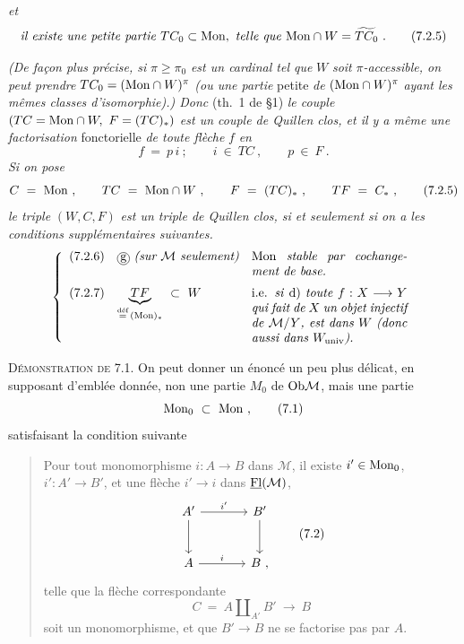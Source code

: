 
\textit{et}
\[
\text{\textit{il existe une petite partie} } TC_0 \subset \Mon, \text{ \textit{telle que} } \Mon \cap W = \widetilde{TC_0}\ . \tag*{(7.2.5)} %
\]

\textit{(De façon plus précise, si} $\pi \geq \pi_0$ \textit{est un cardinal tel que} $W$ \textit{soit} $\pi$\textit{-accessible, on peut prendre} $TC_0 = (\mathrm{Mon} \cap W)^{\pi}$ \textit{(ou une partie} petite \textit{de} $(\mathrm{Mon} \cap W)^{\pi}$ \textit{ayant les mêmes classes d'isomorphie).) Donc} (th.~1 de §1) \textit{le couple} $(TC = \mathrm{Mon} \cap W,\ F = (TC)_*)$ \textit{est un couple de Quillen clos, et il y a même une factorisation} fonctorielle \textit{de toute flèche} $f$ \textit{en}
\[
f \ = \ p\, i \ ; \qquad i \ \in \ TC \ , \qquad p \ \in \ F \ . \tag*{(7.2.4)}
\]
\textit{Si on pose}
\[
C \ = \ \Mon \ , \qquad TC \ = \ \Mon \cap W \ , \qquad F \ = \ (TC)_* \ , \qquad TF \ = \ C_* \ , \tag*{(7.2.5)}
\]
\textit{le triple} $(W, C, F)$ \textit{est un triple de Quillen clos, si et seulement si on a les conditions supplémentaires suivantes.}
\[
\left\{
\begin{array}{lll}
\text{(7.2.6)} & \cercle{g}\ \text{\textit{(sur $\mathcal{M}$ seulement)}} & \parbox[t]{0.36\textwidth}{Mon \textit{stable par cochangement de base.}} \\[4ex]
\text{(7.2.7)} & \underbrace{TF}_{\overset{\text{déf}}{=}\,(\Mon)_*} \ \subset \ W & \parbox[t]{0.36\textwidth}{i.e. \textit{si} d) \textit{toute} $f : X \longrightarrow Y$ \textit{qui fait de} $X$ \textit{un objet injectif de} $\mathcal{M}/Y$\textit{, est dans} $W$ \textit{(donc aussi dans} $W_{\mathrm{univ}}$\textit{).}}
\end{array}
\right.
\]


\textsc{Démonstration de} 7.1. On peut donner un énoncé un peu plus délicat, en supposant d'emblée donnée, non une partie $M_0$ de $\mathrm{Ob} \mathcal{M}$, mais une partie
\[
\Mon_0 \ \subset \ \Mon \ , \tag*{(7.1)}
\]
satisfaisant la condition suivante

\begin{quote}
Pour tout monomorphisme $i : A \longrightarrow B$ dans $\mathcal{M}$, il existe $i' \in \mathrm{Mon}_0$, $i' : A' \longrightarrow B'$, et une flèche $i' \longrightarrow i$ dans $\underline{\mathrm{Fl}}(\mathcal{M})$,
\[
\begin{tikzcd}[row sep=large, column sep=large]
A' \arrow[r, "{i'}"] \arrow[d] & B' \arrow[d] \\
A \arrow[r, "i"] & B \ ,
\end{tikzcd}
\tag*{(7.2)}
\]
telle que la flèche correspondante
\[
C \ = \ A \amalg_{A'} B' \ \longrightarrow \ B
\]
soit un monomorphisme, et que $B' \longrightarrow B$ ne se factorise pas par $A$.
\end{quote}

